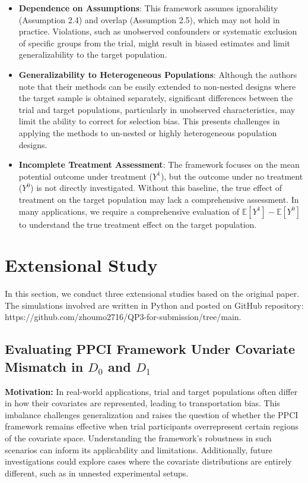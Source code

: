 \documentclass[12pt, oneside]{amsart}
\theoremstyle{definition}
\theoremstyle{remark}
\numberwithin{equation}{section}
\begin{document}
\begin{itemize}
    \item \textbf{Dependence on Assumptions}: This framework assumes ignorability (Assumption 2.4) and overlap (Assumption 2.5), which may not hold in practice. Violations, such as unobserved confounders or systematic exclusion of specific groups from the trial, might result in biased estimates and limit generalizability to the target population.
    
    \item \textbf{Generalizability to Heterogeneous Populations}: Although the authors note that their methods can be easily extended to non-nested designs where the target sample is obtained separately, significant differences between the trial and target populations, particularly in unobserved characteristics, may limit the ability to correct for selection bias. This presents challenges in applying the methods to un-nested or highly heterogeneous population designs. 
    
    \item \textbf{Incomplete Treatment Assessment}: The framework focuses on the mean potential outcome under treatment ($Y^1$), but the outcome under no treatment ($Y^0$) is not directly investigated. Without this baseline, the true effect of treatment on the target population may lack a comprehensive assessment. In many applications, we require a comprehensive evaluation of $\mathbb{E}[Y^1] - \mathbb{E}[Y^0]$ to understand the true treatment effect on the target population.
\end{itemize}

\section{Extensional Study}
In this section, we conduct three extensional studies based on the original paper. The simulations involved are written in Python and posted on GitHub repository: https://github.com/zhoumo2716/QP3-for-submission/tree/main. 

\subsection{Evaluating PPCI Framework Under Covariate Mismatch in $D_0$ and $D_1$}

\textbf{Motivation:} In real-world applications, trial and target populations often differ in how their covariates are represented, leading to transportation bias. This imbalance challenges generalization and raises the question of whether the PPCI framework remains effective when trial participants overrepresent certain regions of the covariate space. Understanding the framework's robustness in such scenarios can inform its applicability and limitations. Additionally, future investigations could explore cases where the covariate distributions are entirely different, such as in unnested experimental setups.
\end{document}
